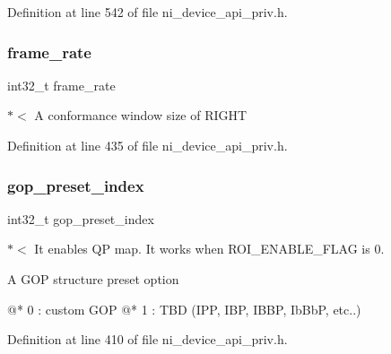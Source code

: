 Definition at line 542 of file ni\+\_\+device\+\_\+api\+\_\+priv.\+h.

\mbox{\label{struct__ni__encoder__change__params__t_a729fea7e7e39ba5c309e5289844bb285}} 
\subsubsection{\texorpdfstring{frame\_rate}{frame\_rate}}
{\footnotesize\ttfamily int32\+\_\+t frame\+\_\+rate}

$\ast$$<$ A conformance window size of R\+I\+G\+HT 

Definition at line 435 of file ni\+\_\+device\+\_\+api\+\_\+priv.\+h.

\mbox{\label{struct__ni__encoder__change__params__t_ab0b73cbef66b6ba4166889a36bb20d4a}} 
\subsubsection{\texorpdfstring{gop\_preset\_index}{gop\_preset\_index}}
{\footnotesize\ttfamily int32\+\_\+t gop\+\_\+preset\+\_\+index}

$\ast$$<$ It enables QP map. It works when R\+O\+I\+\_\+\+E\+N\+A\+B\+L\+E\+\_\+\+F\+L\+AG is 0.


\begin{DoxyItemize}
\item \begin{DoxyVerb}A GOP structure preset option

@* 0 : custom GOP
@* 1 : TBD (IPP, IBP, IBBP, IbBbP, etc..)
\end{DoxyVerb}
 
\end{DoxyItemize}

Definition at line 410 of file ni\+\_\+device\+\_\+api\+\_\+priv.\+h.

\mbox{\label{struct__ni__encoder__change__params__t_a821d5b82e11f8ba2e7fee3cbea45ae70}} 
